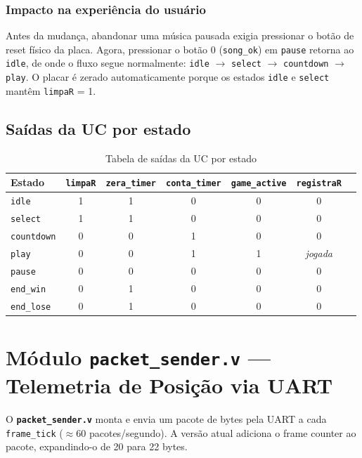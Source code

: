 \documentclass[12pt, a4paper]{article}
\newcommand{\vfile}[1]{\texttt{\textbf{#1}}}
\newcommand{\vsig}[1]{\texttt{#1}}
\begin{document}
\subsubsection{Impacto na experiência do usuário}

Antes da mudança, abandonar uma música pausada exigia pressionar o botão de
reset físico da placa. Agora, pressionar o botão 0 (\texttt{song\_ok}) em
\texttt{pause} retorna ao \texttt{idle}, de onde o fluxo segue normalmente:
\texttt{idle} $\to$ \texttt{select} $\to$ \texttt{countdown} $\to$
\texttt{play}. O placar é zerado automaticamente porque os estados
\texttt{idle} e \texttt{select} mantêm \vsig{limpaR} = 1.

\subsection{Saídas da UC por estado}

\begin{table}[h!]
\centering
\caption{Tabela de saídas da UC por estado}
\label{tab:saidas-uc}
\small
\begin{tabular}{lcccccc}
\toprule
\textbf{Estado}    & \vsig{limpaR} & \vsig{zera\_timer} & \vsig{conta\_timer} & \vsig{game\_active} & \vsig{registraR} \\
\midrule
\texttt{idle}      & 1 & 1 & 0 & 0 & 0 \\
\texttt{select}    & 1 & 1 & 0 & 0 & 0 \\
\texttt{countdown} & 0 & 0 & 1 & 0 & 0 \\
\texttt{play}      & 0 & 0 & 1 & 1 & \textit{jogada} \\
\texttt{pause}     & 0 & 0 & 0 & 0 & 0 \\
\texttt{end\_win}  & 0 & 1 & 0 & 0 & 0 \\
\texttt{end\_lose} & 0 & 1 & 0 & 0 & 0 \\
\bottomrule
\end{tabular}
\end{table}

\section{Módulo \texttt{packet\_sender.v} — Telemetria de Posição via UART}

O \vfile{packet\_sender.v} monta e envia um pacote de bytes pela UART a cada
\vsig{frame\_tick} ($\approx$60 pacotes/segundo). A versão atual adiciona o
frame counter ao pacote, expandindo-o de 20 para 22 bytes.
\end{document}
